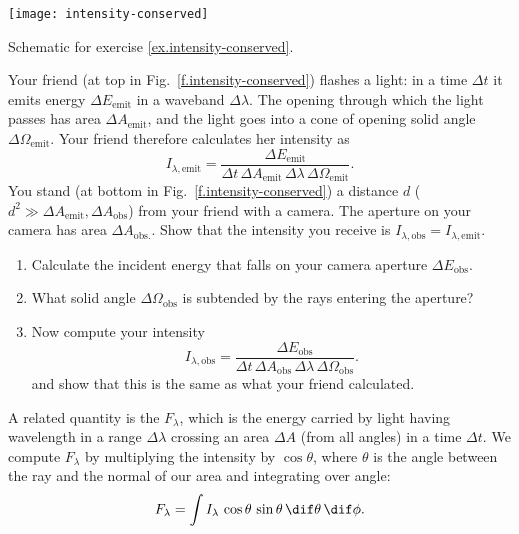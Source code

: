 \begin{marginfigure}
\texttt{[image: intensity-conserved]}
\caption[Schematic of intensity being constant]{\label{f.intensity-conserved} Schematic for exercise \ref{ex.intensity-conserved}.}
\end{marginfigure}
\begin{exercisebox}
\label{ex.intensity-conserved}
Your friend (at top in Fig.~\ref{f.intensity-conserved}) flashes a light: in a time $\Delta t$ it emits energy $\Delta E_{\mathrm{emit}}$ in a waveband $\Delta\lambda$. The opening through which the light passes has area $\Delta A_{\mathrm{emit}}$, and the light goes into a cone of opening solid angle $\Delta\Omega_{\mathrm{emit}}$. Your friend therefore calculates her intensity as
\[	
	I_{\lambda,\mathrm{emit}} = \frac{\Delta E_{\mathrm{emit}}}{\Delta t\,\Delta A_{\mathrm{emit}}\,\Delta\lambda \,\Delta\Omega_{\mathrm{emit}}}.
\]
You stand (at bottom in Fig.~\ref{f.intensity-conserved}) a distance $d$ ($d^{2}\gg \Delta A_{\mathrm{emit}}, \Delta A_{\mathrm{obs}}$) from your friend with a camera. The aperture on your camera has area $\Delta A_{\mathrm{obs.}}$. Show that the intensity you receive is $I_{\lambda,\mathrm{obs}} = I_{\lambda,\mathrm{emit}}$.
\begin{enumerate}
\item Calculate the incident energy that falls on your camera aperture $\Delta E_{\mathrm{obs}}$.
\item What solid angle $\Delta\Omega_{\mathrm{obs}}$ is subtended by the rays entering the aperture?
\item Now compute your intensity
\[	
	I_{\lambda,\mathrm{obs}} = \frac{\Delta E_{\mathrm{obs}}}{\Delta t\,\Delta A_{\mathrm{obs}}\,\Delta\lambda \,\Delta\Omega_{\mathrm{obs}}}.
\]
and show that this is the same as what your friend calculated.
\end{enumerate}
\end{exercisebox}

A related quantity is the  $F_{\lambda}$, which is the energy carried by light having wavelength in a range $\Delta\lambda$ crossing an area $\Delta A$ (from all angles) in a time $\Delta t$. We compute $F_{\lambda}$ by multiplying the intensity by $\cos\theta$, where $\theta$ is the angle between the ray and the normal of our area and integrating over angle:
\begin{equation}\label{e.specific-flux}
F_{\lambda} =  \int I_{\lambda}\,\cos\theta\,\sin\theta\,\dif\theta\,\dif\phi.
\end{equation}

